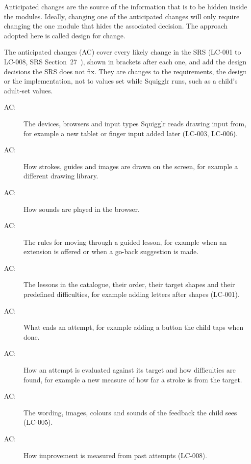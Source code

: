 \documentclass[12pt, titlepage]{article}
\newcounter{acnum}
\newcommand{\actheacnum}{AC\theacnum}
\begin{document}
Anticipated changes are the source of the information that is to be hidden
inside the modules. Ideally, changing one of the anticipated changes will only
require changing the one module that hides the associated decision. The approach
adopted here is called design for
change.

The anticipated changes (AC) cover every likely change in the SRS (LC-001 to
LC-008,
SRS Section~27~\citep{SRS}), shown in brackets after each one, and add the
design decisions the SRS does not fix. They are changes to the requirements,
the design or the implementation, not to values set while Squigglr runs, such as
a child's adult-set values.

\begin{description}
\item[ \actheacnum \label{acDevice}:] The devices,
  browsers and input types Squigglr reads drawing input from, for example a new
  tablet or finger input added later (LC-003, LC-006).
\item[ \actheacnum \label{acDisplay}:] How strokes, guides
  and images are drawn on the screen, for example a different drawing library.
\item[ \actheacnum \label{acAudio}:] How sounds are played
  in the browser.
\item[ \actheacnum \label{acLessonFlow}:] The rules for
  moving through a guided lesson, for example when an extension is offered or
  when a go-back suggestion is made.
\item[ \actheacnum \label{acCatalogue}:] The lessons in
  the catalogue, their order, their target shapes and their predefined
  difficulties, for example adding letters after shapes (LC-001).
\item[ \actheacnum \label{acAttemptEnd}:] What ends an
  attempt, for example adding a button the child taps when done.
\item[ \actheacnum \label{acEvaluation}:] How an attempt
  is evaluated against its target and how difficulties are found, for example a
  new measure of how far a stroke is from the target.
\item[ \actheacnum \label{acFeedback}:] The wording,
  images, colours and sounds of the feedback the child sees (LC-005).
\item[ \actheacnum \label{acImprovement}:] How
  improvement is measured from past attempts (LC-008).

\end{description}
\end{document}

